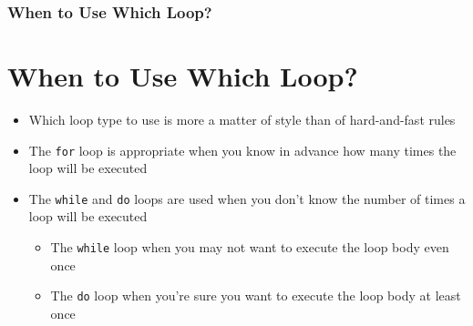 \documentclass{beamer}
\begin{document}
\begin{frame}
    \frametitle{When to Use Which Loop?}
    \section{When to Use Which Loop?} %
    \label{sec:which}
    \begin{itemize}
        \item Which loop type to use is more a matter of style than of hard-and-fast rules
        \item The \texttt{for} loop is appropriate when you know in advance how many times the loop will be executed
        \item The \texttt{while} and \texttt{do} loops are used when you don't know the number of times a loop will be executed
        \begin{itemize}
            \item The \texttt{while} loop when you may not want to execute the loop body even once
            \item The \texttt{do} loop when you're sure you want to execute the loop body at least once
        \end{itemize}
    \end{itemize}
\end{frame}
\end{document}
